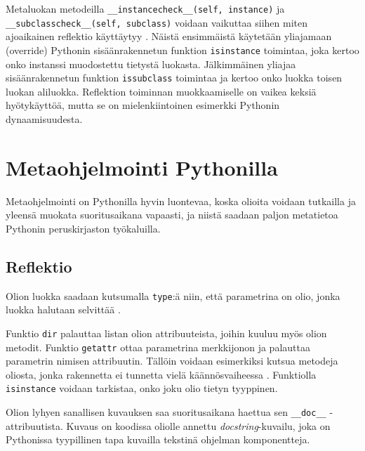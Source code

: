 \documentclass[finnish]{tktltiki2}
\theoremstyle{definition}
\theoremstyle{remark}
\begin{document}
Metaluokan metodeilla \verb|__instancecheck__(self, instance)| ja \\\lstinline|__subclasscheck__(self, subclass)| voidaan vaikuttaa siihen miten ajoaikainen reflektio käyttäytyy \cite{magic-methods, Python-docs}. Näistä ensimmäistä käytetään yliajamaan (override) Pythonin sisäänrakennetun funktion \verb|isinstance| toimintaa, joka kertoo onko instanssi muodostettu tietystä luokasta. Jälkimmäinen yliajaa sisäänrakennetun funktion \verb|issubclass| toimintaa ja kertoo onko luokka toisen luokan aliluokka. Reflektion toiminnan muokkaamiselle on vaikea keksiä hyötykäyttöä, mutta se on mielenkiintoinen esimerkki Pythonin dynaamisuudesta.



\section{Metaohjelmointi Pythonilla}


Metaohjelmointi on Pythonilla hyvin luontevaa, koska olioita voidaan tutkailla ja yleensä muokata suoritusaikana vapaasti, ja niistä saadaan paljon metatietoa Pythonin peruskirjaston työkaluilla.


\subsection{Reflektio}



Olion luokka saadaan kutsumalla \verb|type|:ä niin, että parametrina on olio, jonka luokka halutaan selvittää \cite{dive-into-python}. 

Funktio \verb|dir| palauttaa listan olion attribuuteista, joihin kuuluu myös olion metodit. Funktio \verb|getattr| ottaa parametrina merkkijonon ja palauttaa parametrin nimisen attribuutin. Tällöin voidaan esimerkiksi kutsua metodeja oliosta, jonka rakennetta ei tunnetta vielä käännösvaiheessa \cite{dive-into-python}. Funktiolla \verb|isinstance| voidaan tarkistaa, onko joku olio tietyn tyyppinen. 

Olion lyhyen sanallisen kuvauksen saa suoritusaikana haettua sen \verb|__doc__| -attribuutista. Kuvaus on koodissa oliolle annettu \emph{docstring}-kuvailu, joka on Pythonissa tyypillinen tapa kuvailla tekstinä ohjelman komponentteja.
\end{document}
